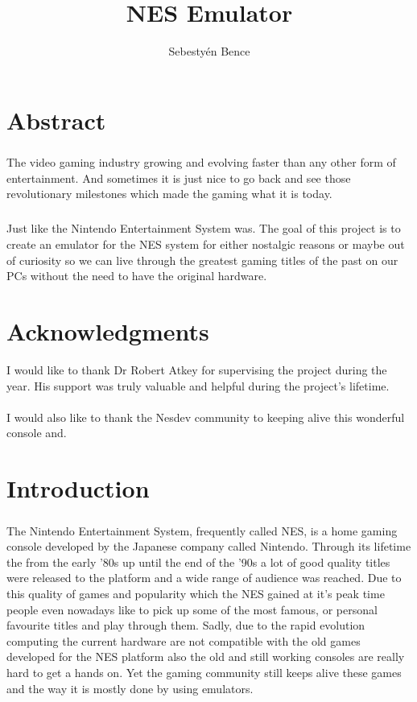 \documentclass[]{report}
\title{NES Emulator}
\author{Sebestyén Bence}
\begin{document}
	
\chapter*{Abstract}
\paragraph{ }
The video gaming industry growing and evolving faster than any other form of entertainment. And sometimes it is just nice to go back and see those revolutionary milestones which made the gaming what it is today. 
\paragraph{ }
Just like the Nintendo Entertainment System was. The goal of this project is to create an emulator for the NES system for either nostalgic reasons or maybe out of curiosity so we can live through the greatest gaming titles of the past on our PCs without the need to have the original hardware.

\pagebreak

\chapter*{Acknowledgments}
I would like to thank Dr Robert Atkey for supervising the project during the year. His support was truly valuable and helpful during the project's lifetime.
\\
\\
I would also like to thank the Nesdev community to keeping alive this wonderful console and.
\pagebreak


\tableofcontents

\clearpage

\chapter{Introduction}

\paragraph{}
The Nintendo Entertainment System, frequently called NES, is a home gaming console developed by the Japanese company called Nintendo.  Through its lifetime the from the early '80s up until the end of the '90s a lot of good quality titles were released to the platform and a wide range of audience was reached. Due to this quality of games and popularity which the NES gained at it's peak time people even nowadays like to pick up some of the most famous, or personal favourite titles and play through them. Sadly, due to the rapid evolution computing the current hardware are not compatible with the old games developed for the NES platform also the old and still working consoles are really hard to get a hands on. Yet the gaming community still keeps alive these games and the way it is mostly done by using emulators.
\end{document}
